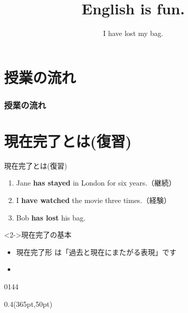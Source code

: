 \documentclass[aspectratio=169,xcolor={dvipsnames,table}]{beamer}
\title{English is fun.}
\subtitle{I have lost my bag.}
\author{}
\institute[]{}
\date[]
\newcommand{\myaudio}[1]{\href{#1}{\faVolumeUp}}
\begin{document}
\begin{frame}[plain]
  \titlepage
\end{frame}

\section*{授業の流れ}
\begin{frame}[plain]
  \frametitle{授業の流れ}
  \tableofcontents
\end{frame}
\section{現在完了とは(復習)}
\begin{frame}[plain]{現在完了とは(復習)}
 \begin{enumerate}
 \item Jane \textcolor{NavyBlue}{\bfseries has stayed} in London for six years.（継続）
 \item I \textcolor{NavyBlue}{\bfseries have watched} the movie three times.（経験）
 \item Bob \textcolor{NavyBlue}{\bfseries has lost} his bag.
\end{enumerate}

\vspace{30pt}

 \begin{block}<2->{現在完了の基本}
\small
\begin{itemize}[square]
 \item<3->  現在完了形\,\,は「過去と現在にまたがる表現」です\\
\hfill{}
 \item {}%
\end{itemize}
      \end{block}
\hfill{\tiny 0144}\,{\scriptsize \myaudio{./audio/014_have_pp_kekka_01.mp3}}

\begin{textblock*}{0.4\linewidth}(365pt,50pt)
\end{textblock*}
\end{frame}
\end{document}
